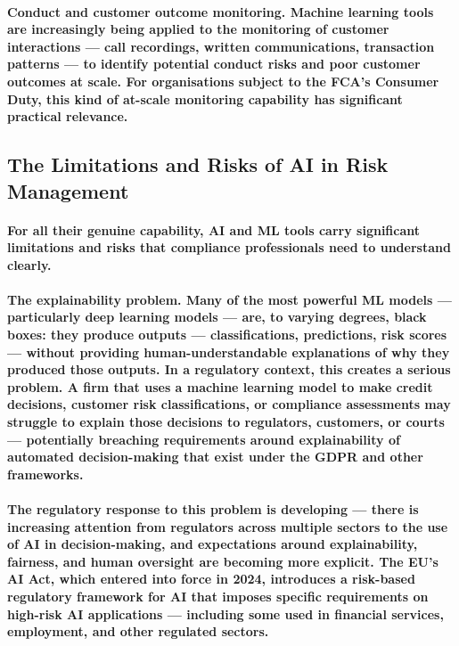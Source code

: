 \paragraph{\textbf{Conduct and customer outcome monitoring}. Machine learning tools are increasingly being applied to the monitoring of customer interactions — call recordings, written communications, transaction patterns — to identify potential conduct risks and poor customer outcomes at scale. For organisations subject to the FCA's Consumer Duty, this kind of at-scale monitoring capability has significant practical relevance.}

\subsection{The Limitations and Risks of AI in Risk Management}
\paragraph{For all their genuine capability, AI and ML tools carry significant limitations and risks that compliance professionals need to understand clearly.}
\paragraph{\textbf{The explainability problem}. Many of the most powerful ML models — particularly deep learning models — are, to varying degrees, \textbf{black boxes}: they produce outputs — classifications, predictions, risk scores — without providing human-understandable explanations of why they produced those outputs. In a regulatory context, this creates a serious problem. A firm that uses a machine learning model to make credit decisions, customer risk classifications, or compliance assessments may struggle to explain those decisions to regulators, customers, or courts — potentially breaching requirements around explainability of automated decision-making that exist under the GDPR and other frameworks.}
\paragraph{The regulatory response to this problem is developing — there is increasing attention from regulators across multiple sectors to the use of AI in decision-making, and expectations around explainability, fairness, and human oversight are becoming more explicit. The EU's AI Act, which entered into force in 2024, introduces a risk-based regulatory framework for AI that imposes specific requirements on high-risk AI applications — including some used in financial services, employment, and other regulated sectors.}

